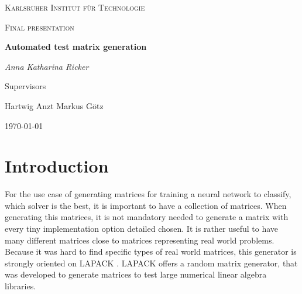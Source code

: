 \documentclass[a4paper]{article}
\begin{document}
	
	\begin{titlepage}
		\centering
		{\scshape\LARGE Karlsruher Institut für Technologie\par}
		\vspace{1cm}
		{\scshape\Large Final presentation\par}
		\vspace{1.5cm}
		{\huge\bfseries Automated test matrix generation\par}
		\vspace {2cm}
		
		{\Large\itshape Anna Katharina Ricker\par}
		
		\vfill
		Supervisors\par
		Hartwig Anzt
		Markus G\"{o}tz
		
		\vfill
		{\large\today\par}
	\end{titlepage}
	
	\tableofcontents
	\newpage
	
\section{Introduction}	
For the use case of generating matrices for training a neural network to classify, which solver is the best, it is important to have a collection of matrices. When generating this matrices, it is not mandatory needed to generate a matrix with every tiny implementation option detailed chosen. 
It is rather useful to have many different matrices close to matrices representing real world problems. Because it was hard to find specific types of real world matrices, this generator is strongly oriented on LAPACK \cite{LAPACK}. LAPACK offers a random matrix generator, that was developed to generate matrices to test large numerical linear algebra libraries. 
\end{document}
